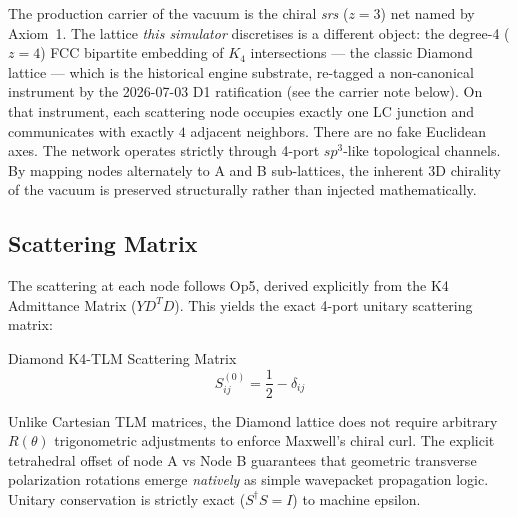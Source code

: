 The production carrier of the vacuum is the chiral \emph{srs} ($z = 3$) net named by Axiom~1. The lattice \emph{this simulator} discretises is a different object: the degree-4 ($z = 4$) FCC bipartite embedding of $K_4$ intersections --- the classic Diamond lattice --- which is the historical engine substrate, re-tagged a non-canonical instrument by the 2026-07-03 D1 ratification (see the carrier note below). On that instrument, each scattering node occupies exactly one LC junction and communicates with exactly $4$ adjacent neighbors.
There are no fake Euclidean axes. The network operates strictly through 4-port $sp^3$-like topological channels. By mapping nodes alternately to A and B sub-lattices, the inherent 3D chirality of the vacuum is preserved structurally rather than injected mathematically.

\subsection{Scattering Matrix}

The scattering at each node follows Op5, derived explicitly from the K4 Admittance Matrix ($YD^TD$). This yields the exact 4-port unitary scattering matrix:
\begin{resultbox}{Diamond K4-TLM Scattering Matrix}
\begin{equation}
    S^{(0)}_{ij} = \frac{1}{2} - \delta_{ij}
    \label{eq:k4_scatter}
\end{equation}
\end{resultbox}

Unlike Cartesian TLM matrices, the Diamond lattice does not require arbitrary $R(\theta)$ trigonometric adjustments to enforce Maxwell's chiral curl. The explicit tetrahedral offset of node A vs Node B guarantees that geometric transverse polarization rotations emerge \textit{natively} as simple wavepacket propagation logic. Unitary conservation is strictly exact ($S^\dagger S = I$) to machine epsilon.

